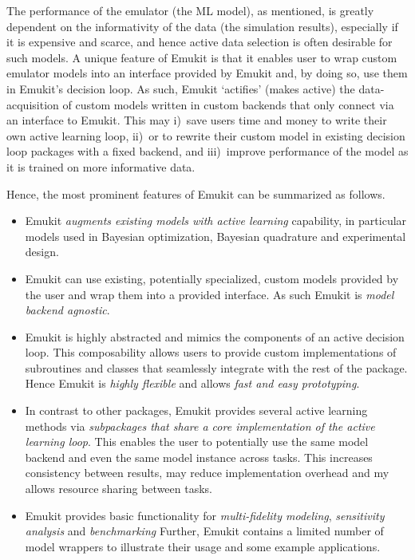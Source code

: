 The performance of the emulator (the ML model), as mentioned, is greatly dependent on the informativity of the data (the simulation results), especially if it is expensive and scarce, and hence active data selection is often desirable for such models. A unique feature of Emukit is that it enables user to wrap custom emulator models into an interface provided by Emukit and, by doing so, use them in Emukit's decision loop. As such, Emukit `actifies' (makes active) the data-acquisition of custom models written in custom backends that only connect via an interface to Emukit. This may i)~save users time and money to write their own active learning loop, ii)~or to rewrite their custom model in existing decision loop packages with a fixed backend, and iii)~improve performance of the model as it is trained on more informative data.

Hence, the most prominent features of Emukit can be summarized as follows.

\begin{itemize}
\item Emukit \emph{augments existing models with active learning} capability, in particular models used in Bayesian optimization, Bayesian quadrature and experimental design.
\item Emukit can use existing, potentially specialized, custom models provided by the user and wrap them into a provided interface. As such Emukit is \emph{model backend agnostic}.
  \item Emukit is highly abstracted and mimics the components of an active decision loop. This composability allows users to provide custom implementations of subroutines and classes that seamlessly integrate with the rest of the package. Hence Emukit is \emph{highly flexible} and allows \emph{fast and easy prototyping}.
  \item In contrast to other packages, Emukit provides several active learning methods via \emph{subpackages that share a core implementation of the active learning loop}. This enables the user to potentially use the same model backend and even the same model instance across tasks. This increases consistency between results, may reduce implementation overhead and my allows resource sharing between tasks.
 \item Emukit provides basic functionality for \emph{multi-fidelity modeling}, \emph{sensitivity analysis} and \emph{benchmarking}  Further, Emukit contains a limited number of model wrappers to illustrate their usage and some example applications. 
\end{itemize}

